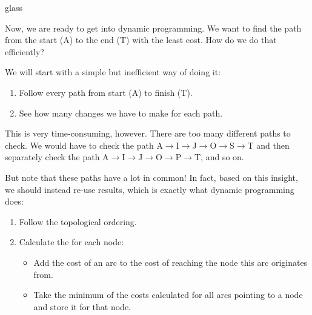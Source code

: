 \begin{tblsfilledsymbol}{}{glass}
\begin{underthehood}
\begin{center}
  \end{center}\unskip

Now, we are ready to get into dynamic programming.  We want to find
the path from the start (A) to the end (T) with the least cost.  How
do we do that efficiently?

We will start with a simple but inefficient way of doing it:

\begin{enumerate}
\item Follow every path from start (A) to finish (T).
\item See how many changes we have to make for each path.
\end{enumerate}

This is very time-consuming, however.  There are too many different
paths to check.  We would have to check the path
A$\to$I$\to$J$\to$O$\to$S$\to$T and then separately check the path
A$\to$I$\to$J$\to$O$\to$P$\to$T, and so on.  

But note that these paths have a lot in common!
In fact, based on this insight, we should instead re-use results, which is
exactly what dynamic programming  does:

\begin{enumerate}
\item Follow the topological ordering.
\item Calculate the  for each node:
  
  \begin{itemize}
  \item Add the cost of an arc to the cost of reaching the node this
    arc originates from.
    
  \item Take the minimum of the costs calculated for all arcs pointing
    to a node and store it for that node.
  \end{itemize}
\end{enumerate}


\end{underthehood}
\end{tblsfilledsymbol}
